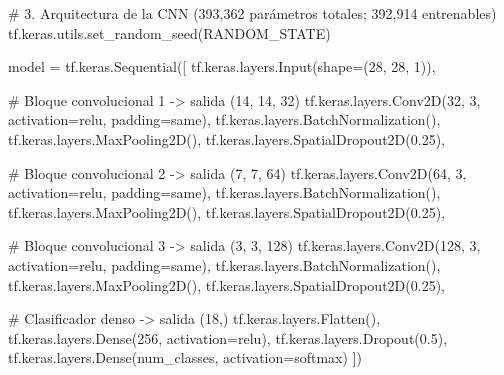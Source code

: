\documentclass[
  spanish,
  us-letterpaper,
]{scrreprt}
\newenvironment{Shaded}{\begin{snugshade}}{\end{snugshade}}
\newcommand{\CommentTok}[1]{\textcolor[rgb]{0.37,0.37,0.37}{#1}}
\newcommand{\DecValTok}[1]{\textcolor[rgb]{0.68,0.00,0.00}{#1}}
\newcommand{\FloatTok}[1]{\textcolor[rgb]{0.68,0.00,0.00}{#1}}
\newcommand{\NormalTok}[1]{\textcolor[rgb]{0.00,0.23,0.31}{#1}}
\newcommand{\OperatorTok}[1]{\textcolor[rgb]{0.37,0.37,0.37}{#1}}
\newcommand{\StringTok}[1]{\textcolor[rgb]{0.13,0.47,0.30}{#1}}
\theoremstyle{definition}
\theoremstyle{remark}
\begin{document}
\label{cnn-arquitectura-entrenamiento}
\begin{Shaded}
\begin{Highlighting}[]
\CommentTok{\# 3. Arquitectura de la CNN (393,362 parámetros totales; 392,914 entrenables)}
\NormalTok{tf.keras.utils.set\_random\_seed(RANDOM\_STATE)}

\NormalTok{model }\OperatorTok{=}\NormalTok{ tf.keras.Sequential([}
\NormalTok{    tf.keras.layers.Input(shape}\OperatorTok{=}\NormalTok{(}\DecValTok{28}\NormalTok{, }\DecValTok{28}\NormalTok{, }\DecValTok{1}\NormalTok{)),}

    \CommentTok{\# Bloque convolucional 1 {-}\textgreater{} salida (14, 14, 32)}
\NormalTok{    tf.keras.layers.Conv2D(}\DecValTok{32}\NormalTok{, }\DecValTok{3}\NormalTok{, activation}\OperatorTok{=}\StringTok{\textquotesingle{}relu\textquotesingle{}}\NormalTok{, padding}\OperatorTok{=}\StringTok{\textquotesingle{}same\textquotesingle{}}\NormalTok{),}
\NormalTok{    tf.keras.layers.BatchNormalization(),}
\NormalTok{    tf.keras.layers.MaxPooling2D(),}
\NormalTok{    tf.keras.layers.SpatialDropout2D(}\FloatTok{0.25}\NormalTok{),}

    \CommentTok{\# Bloque convolucional 2 {-}\textgreater{} salida (7, 7, 64)}
\NormalTok{    tf.keras.layers.Conv2D(}\DecValTok{64}\NormalTok{, }\DecValTok{3}\NormalTok{, activation}\OperatorTok{=}\StringTok{\textquotesingle{}relu\textquotesingle{}}\NormalTok{, padding}\OperatorTok{=}\StringTok{\textquotesingle{}same\textquotesingle{}}\NormalTok{),}
\NormalTok{    tf.keras.layers.BatchNormalization(),}
\NormalTok{    tf.keras.layers.MaxPooling2D(),}
\NormalTok{    tf.keras.layers.SpatialDropout2D(}\FloatTok{0.25}\NormalTok{),}

    \CommentTok{\# Bloque convolucional 3 {-}\textgreater{} salida (3, 3, 128)}
\NormalTok{    tf.keras.layers.Conv2D(}\DecValTok{128}\NormalTok{, }\DecValTok{3}\NormalTok{, activation}\OperatorTok{=}\StringTok{\textquotesingle{}relu\textquotesingle{}}\NormalTok{, padding}\OperatorTok{=}\StringTok{\textquotesingle{}same\textquotesingle{}}\NormalTok{),}
\NormalTok{    tf.keras.layers.BatchNormalization(),}
\NormalTok{    tf.keras.layers.MaxPooling2D(),}
\NormalTok{    tf.keras.layers.SpatialDropout2D(}\FloatTok{0.25}\NormalTok{),}

    \CommentTok{\# Clasificador denso {-}\textgreater{} salida (18,)}
\NormalTok{    tf.keras.layers.Flatten(),}
\NormalTok{    tf.keras.layers.Dense(}\DecValTok{256}\NormalTok{, activation}\OperatorTok{=}\StringTok{\textquotesingle{}relu\textquotesingle{}}\NormalTok{),}
\NormalTok{    tf.keras.layers.Dropout(}\FloatTok{0.5}\NormalTok{),}
\NormalTok{    tf.keras.layers.Dense(num\_classes, activation}\OperatorTok{=}\StringTok{\textquotesingle{}softmax\textquotesingle{}}\NormalTok{)}
\NormalTok{])}


\end{Highlighting}
\end{Shaded}
\end{document}
